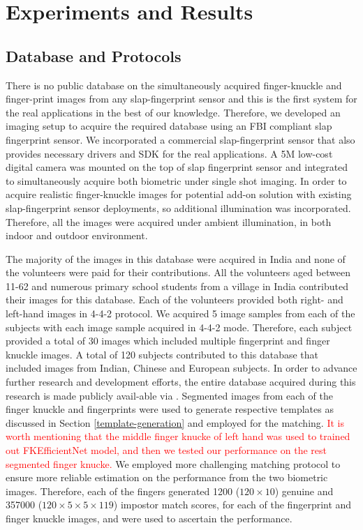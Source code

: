 \section{Experiments and Results\label{experiment}}

\subsection{Database and Protocols\label{database-protocol}}

There is no public database on the simultaneously acquired finger-knuckle and finger-print images from any slap-fingerprint sensor and this is the first system for the real applications in the best of our knowledge. Therefore, we developed an imaging setup to acquire the required database using an FBI compliant slap fingerprint sensor. We incorporated a commercial slap-fingerprint sensor \cite{futronic} that also provides necessary drivers and SDK for the real applications. A 5M low-cost digital camera \cite{mindvision} was mounted on the top of slap fingerprint sensor and integrated to simultaneously acquire both biometric under single shot imaging. In order to acquire realistic finger-knuckle images for potential add-on solution with existing slap-fingerprint sensor deployments, so additional illumination was incorporated. Therefore, all the images were acquired under ambient illumination, in both indoor and outdoor environment.

The majority of the images in this database were acquired in India and none of the volunteers were paid for their contributions. All the volunteers aged between 11-62 and numerous primary school students from a village in India contributed their images for this database. Each of the volunteers provided both right- and left-hand images in 4-4-2 protocol. We acquired 5 image samples from each of the subjects with each image sample acquired in 4-4-2 mode. Therefore, each subject provided a total of 30 images which included multiple fingerprint and finger knuckle images. A total of 120 subjects contributed to this database that included images from Indian, Chinese and European subjects. In order to advance further research and development efforts, the entire database acquired during this research is made publicly avail-able via \cite{datalink}. Segmented images from each of the finger knuckle and fingerprints were used to generate respective templates as discussed in Section \ref{template-generation} and employed for the matching. \textcolor{red}{It is worth mentioning that the middle finger knucke of left hand was used to trained out FKEfficientNet model, and then we tested our performance on the rest segmented finger knucke.} We employed more challenging matching protocol to ensure more reliable estimation on the performance from the two biometric images. Therefore, each of the fingers generated 1200 ($120 \times 10$) genuine and 357000 ($120 \times 5 \times 5 \times 119$) impostor match scores, for each of the fingerprint and finger knuckle images, and were used to ascertain the performance.  